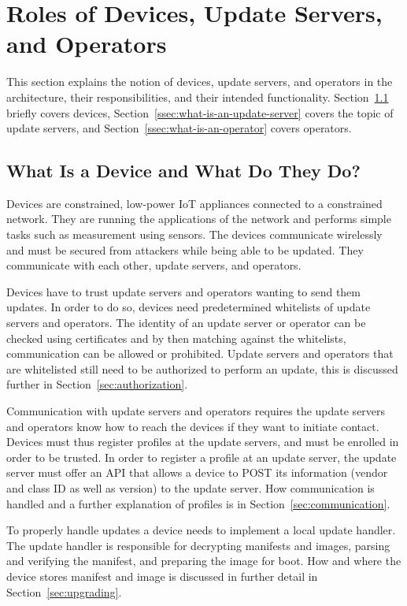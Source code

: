 \documentclass[0-thesis.tex]{subfiles}
\begin{document}
\section{Roles of Devices, Update Servers, and Operators}
\label{sec:roles}
This section explains the notion of devices, update servers, and operators in the
architecture, their responsibilities, and their intended functionality.
Section~\ref{ssec:what-is-a-device} briefly covers devices,
Section~\ref{ssec:what-is-an-update-server} covers the topic of update servers, and
Section~\ref{ssec:what-is-an-operator} covers operators.

\subsection{What Is a Device and What Do They Do?}
\label{ssec:what-is-a-device}
Devices are constrained, low-power IoT appliances connected to a constrained network. They
are running the applications of the network and performs simple tasks such as measurement
using sensors. The devices communicate wirelessly and must be secured from attackers while
being able to be updated. They communicate with each other, update servers, and operators.

Devices have to trust update servers and operators wanting to send them updates. In order
to do so, devices need predetermined whitelists of update servers and operators. The
identity of an update server or operator can be checked using certificates and by then
matching against the whitelists, communication can be allowed or prohibited. Update
servers and operators that are whitelisted still need to be authorized to perform an
update, this is discussed further in Section~\ref{sec:authorization}.

Communication with update servers and operators requires the update servers and operators
know how to reach the devices if they want to initiate contact. Devices must thus register
profiles at the update servers, and must be enrolled in order to be trusted. In order to
register a profile at an update server, the update server must offer an API that allows a
device to POST its information (vendor and class ID as well as version) to the update
server. How communication is handled and a further explanation of profiles is in
Section~\ref{sec:communication}.

To properly handle updates a device needs to implement a local update handler. The update
handler is responsible for decrypting manifests and images, parsing and verifying the
manifest, and preparing the image for boot. How and where the device stores manifest and
image is discussed in further detail in Section~\ref{sec:upgrading}.
\end{document}
